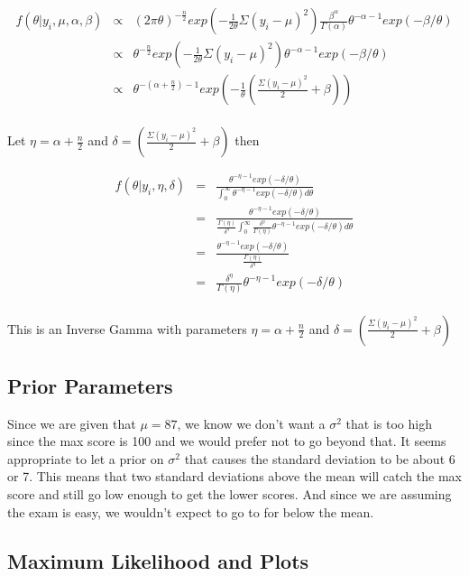\documentclass[12pt]{article}
\begin{document}
\begin{eqnarray*}
f(\theta|y_i,\mu,\alpha,\beta) &\propto& (2\pi\theta)^{-\frac{n}{2}}exp\left(-\frac{1}{2\theta}\Sigma(y_i-\mu)^2\right)\frac{\beta^\alpha}{\Gamma(\alpha)}\theta^{-\alpha-1}exp(-\beta/\theta) \\
&\propto& \theta^{-\frac{n}{2}}exp\left(-\frac{1}{2\theta}\Sigma(y_i-\mu)^2\right)\theta^{-\alpha-1}exp(-\beta/\theta) \\
&\propto& \theta^{-(\alpha+\frac{n}{2})-1}exp\left(-\frac{1}{\theta}\left(\frac{\Sigma(y_i-\mu)^2}{2}+\beta\right)\right) \\
\end{eqnarray*}

\noindent Let $\eta=\alpha+\frac{n}{2}$ and $\delta=\left(\frac{\Sigma(y_i-\mu)^2}{2}+\beta\right)$ then

\begin{eqnarray*}
f(\theta|y_i,\eta,\delta) &=& \frac{\theta^{-\eta-1}exp(-\delta/\theta)}{\int_0^\infty\theta^{-\eta-1}exp(-\delta/\theta)d\theta} \\
&=& \frac{\theta^{-\eta-1}exp(-\delta/\theta)}{\frac{\Gamma(\eta)}{\delta^\eta}\int_0^\infty\frac{\delta^\eta}{\Gamma(\eta)}\theta^{-\eta-1}exp(-\delta/\theta)d\theta} \\
&=& \frac{\theta^{-\eta-1}exp(-\delta/\theta)}{\frac{\Gamma(\eta)}{\delta^\eta}} \\
&=& \frac{\delta^\eta}{\Gamma(\eta)}\theta^{-\eta-1}exp(-\delta/\theta) \\
\end{eqnarray*}

\noindent This is an Inverse Gamma with parameters $\eta=\alpha+\frac{n}{2}$ and $\delta=\left(\frac{\Sigma(y_i-\mu)^2}{2}+\beta\right)$

\subsection{Prior Parameters}

\noindent Since we are given that $\mu=87$, we know we don't want a $\sigma^2$ that is too high since the max score is 100 and we would prefer not to go beyond that.  It seems appropriate to let a prior on $\sigma^2$ that causes the standard deviation to be about 6 or 7.  This means that two standard deviations above the mean will catch the max score and still go low enough to get the lower scores.  And since we are assuming the exam is easy, we wouldn't expect to go to for below the mean.

\subsection{Maximum Likelihood and Plots}
\end{document}
